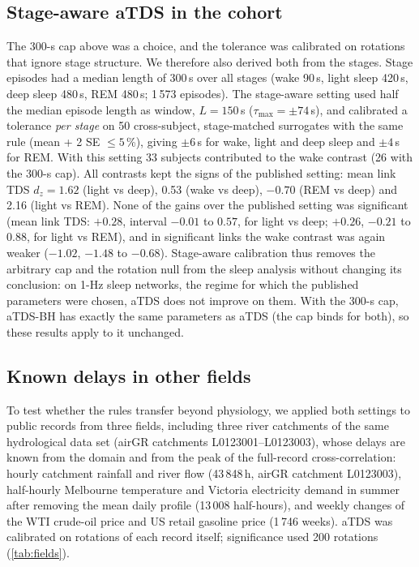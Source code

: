 \documentclass[11pt,a4paper]{article}
\begin{document}
\subsection{Stage-aware aTDS in the cohort}
\label{sec:res-stage}
The 300-s cap above was a choice, and the tolerance was calibrated on rotations that ignore stage structure. We therefore also derived both from the stages. Stage episodes had a median length of 300\,s over all stages (wake 90\,s, light sleep 420\,s, deep sleep 480\,s, REM 480\,s; 1\,573 episodes). The stage-aware setting used half the median episode length as window, $L = 150$\,s ($\tau_{\max} = \pm74$\,s), and calibrated a tolerance \emph{per stage} on 50 cross-subject, stage-matched surrogates with the same rule (mean + 2 SE $\le 5$\,\%), giving $\pm6$\,s for wake, light and deep sleep and $\pm4$\,s for REM. With this setting 33 subjects contributed to the wake contrast (26 with the 300-s cap). All contrasts kept the signs of the published setting: mean link TDS $d_z = 1.62$ (light vs deep), 0.53 (wake vs deep), $-0.70$ (REM vs deep) and 2.16 (light vs REM). None of the gains over the published setting was significant (mean link TDS: $+0.28$, interval $-0.01$ to $0.57$, for light vs deep; $+0.26$, $-0.21$ to $0.88$, for light vs REM), and in significant links the wake contrast was again weaker ($-1.02$, $-1.48$ to $-0.68$). Stage-aware calibration thus removes the arbitrary cap and the rotation null from the sleep analysis without changing its conclusion: on 1-Hz sleep networks, the regime for which the published parameters were chosen, aTDS does not improve on them. With the 300-s cap, aTDS-BH has exactly the same parameters as aTDS (the cap binds for both), so these results apply to it unchanged.

\subsection{Known delays in other fields}
\label{sec:res-fields}
To test whether the rules transfer beyond physiology, we applied both settings to public records from three fields, including three river catchments of the same hydrological data set (airGR catchments L0123001--L0123003), whose delays are known from the domain and from the peak of the full-record cross-correlation: hourly catchment rainfall and river flow (43\,848\,h, airGR catchment L0123003), half-hourly Melbourne temperature and Victoria electricity demand in summer after removing the mean daily profile (13\,008 half-hours), and weekly changes of the WTI crude-oil price and US retail gasoline price (1\,746 weeks). aTDS was calibrated on rotations of each record itself; significance used 200 rotations (\cref{tab:fields}).
\end{document}
